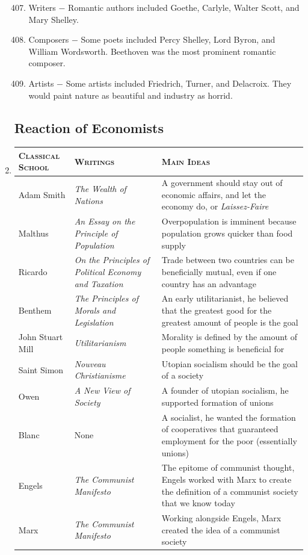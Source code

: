 \documentclass[12pt]{article}
\begin{document}
\begin{enumerate}
\begin{enumerate}[label=\arabic{*}.]
\setcounter{enumii}{406}

\item Writers $-$ Romantic authors included Goethe, Carlyle, Walter Scott, and  Mary Shelley.

\item Composers $-$ Some poets included Percy Shelley, Lord Byron, and William Wordsworth. Beethoven was the most prominent romantic composer. 

\item Artists $-$  Some artists included Friedrich, Turner, and Delacroix. They would paint nature as beautiful and industry as horrid.

\end{enumerate}
\setcounter{enumi}{409}

\subsection{Reaction of Economists}

\item \begin{tabular}{p{} p{} p{}}
\textsc{Classical School} & \textsc{Writings} & \textsc{Main Ideas} \\
\hline
Adam Smith & \textit{The Wealth of Nations} & A government should stay out of economic affairs, and let the economy do, or \textit{Laissez-Faire} \\
\hline
Malthus & \textit{An Essay on the Principle of Population} & Overpopulation is imminent because population grows quicker than food supply \\
\hline 
Ricardo & \textit{On the Principles of Political Economy and Taxation} & Trade between two countries can be beneficially mutual, even if one country has an advantage  \\
\hline
Benthem & \textit{The Principles of Morals and Legislation} & An early utilitarianist, he believed that the greatest good for the greatest amount of people is the goal  \\
\hline
John Stuart Mill & \textit{Utilitarianism} & Morality is defined by the amount of people something is beneficial for  \\
\hline
Saint Simon & \textit{Nouveau Christianisme}  & Utopian socialism should be the goal of a society  \\
\hline
Owen & \textit{A New View of Society} & A founder of utopian socialism, he supported formation of unions  \\
\hline
Blanc & None & A socialist, he wanted the formation of cooperatives that guaranteed employment for the poor (essentially unions) \\
\hline
Engels & \textit{The Communist Manifesto} & The epitome of communist thought, Engels worked with Marx to create the definition of a communist society that we know today  \\
\hline
Marx & \textit{The Communist Manifesto} & Working alongside Engels, Marx created the idea of a communist society  \\
\end{tabular}


\end{enumerate}
\end{document}
